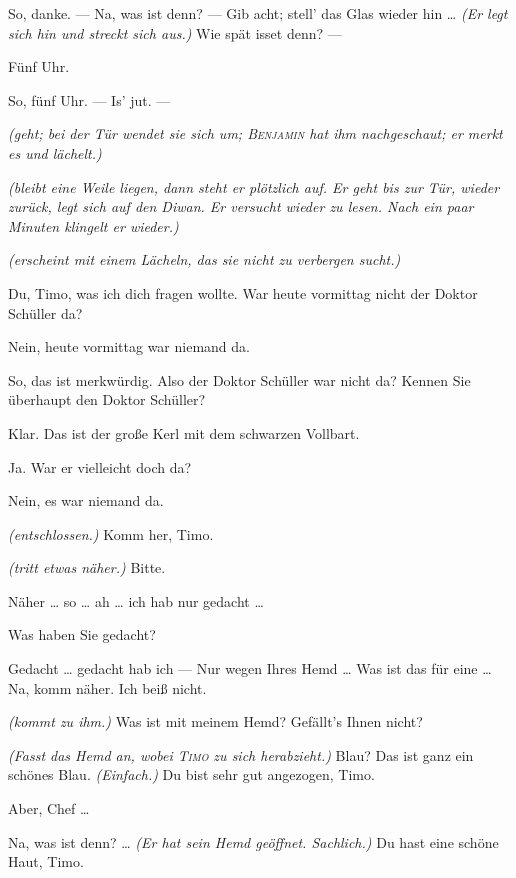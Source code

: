 \documentclass[
	final,
	a4paper,
	ngerman,
	mpinclude = true, %
	twoside = true,
	open = right,
	cleardoublepage = plain,
	DIV = 13,
	BCOR = 1cm,
	titlepage = firstiscover,
	]{scrbook}
\newcommand{\direction}[1]{\textit{(#1)}}
\newcommand{\thecharacter}[1]{\textup{\textsc{#1}}\xspace}
\newcommand{\thepraktikant}{\thecharacter{Timo}}
\newcommand{\theherr}{\thecharacter{Benjamin}}
\newcommand{\character}[1]{\item[#1:]}
\newcommand{\praktikant}{\character{\thepraktikant}}
\newcommand{\herr}{\character{\theherr}}
\begin{document}
\begin{play}
	\herr
	So, danke. --- Na, was ist denn? --- Gib acht; stell' das Glas wieder hin \ldots{} \direction{Er legt sich hin und streckt sich aus.} Wie spät isset denn? ---

	\praktikant
	Fünf Uhr.

	\herr
	So, fünf Uhr. --- Is' jut. ---

	\praktikant
	\direction{geht; bei der Tür wendet sie sich um; \theherr hat ihm nachgeschaut; er merkt es und lächelt.}

	\herr
	\direction{bleibt eine Weile liegen, dann steht er plötzlich auf. Er geht bis zur Tür, wieder zurück, legt sich auf den Diwan. Er versucht wieder zu lesen. Nach ein paar Minuten klingelt er wieder.}

	\praktikant
	\direction{erscheint mit einem Lächeln, das sie nicht zu verbergen sucht.}

	\herr
	Du, Timo, was ich dich fragen wollte. War heute vormittag nicht der Doktor Schüller da?

	\praktikant
	Nein, heute vormittag war niemand da.

	\herr
	So, das ist merkwürdig. Also der Doktor Schüller war nicht da? Kennen Sie überhaupt den Doktor Schüller?

	\praktikant
	Klar. Das ist der große Kerl mit dem schwarzen Vollbart.

	\herr
	Ja. War er vielleicht doch da?

	\praktikant
	Nein, es war niemand da.

	\herr
	\direction{entschlossen.} Komm her, Timo.

	\praktikant
	\direction{tritt etwas näher.} Bitte.

	\herr
	Näher \ldots{} so \ldots{} ah \ldots{} ich hab nur gedacht \ldots{}

	\praktikant
	Was haben Sie gedacht?

	\herr
	Gedacht \ldots{} gedacht hab ich --- Nur wegen Ihres Hemd \ldots{} Was ist das für eine \ldots{} Na, komm näher. Ich beiß nicht.

	\praktikant
	\direction{kommt zu ihm.} Was ist mit meinem Hemd? Gefällt's Ihnen nicht?

	\herr
	\direction{Fasst das Hemd an, wobei \thepraktikant zu sich herabzieht.} Blau? Das ist ganz ein schönes Blau. \direction{Einfach.} Du bist sehr gut angezogen, Timo.

	\praktikant
	Aber, Chef \ldots{}

	\herr
	Na, was ist denn? \ldots{} \direction{Er hat sein Hemd geöffnet. Sachlich.} Du hast eine schöne Haut, Timo.


\end{play}
\end{document}
